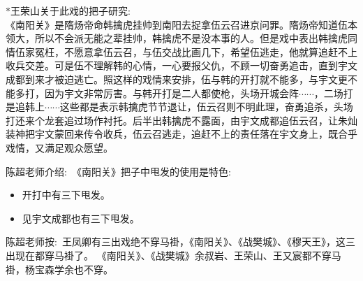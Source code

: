 {{{




\vspace{5pt}






}}

}
\vspace{20pt}
$\ast$王荣山关于此戏的把子研究:\\《南阳关》是隋炀帝命韩擒虎挂帅到南阳去捉拿伍云召进京问罪。隋炀帝知道伍本领大，所以不会派无能之辈挂帅，韩擒虎不是没本事的人。但是戏中表出韩擒虎同情伍家冤枉，不愿意拿伍云召，与伍交战比画几下，希望伍逃走，他就算追赶不上收兵交差。可是伍不理解韩的心情，一心要报父仇，不顾一切奋勇追击，直到宇文成都到来才被迫逃亡。照这样的戏情来安排，伍与韩的开打就不能多，与宇文更不能多打，因为宇文非常厉害。与韩开打是二人都使枪，头场开城会阵$\cdots{}\cdots{}$，二场打是追韩上$\cdots{}\cdots{}$这些都是表示韩擒虎节节退让，伍云召则不明此理，奋勇追杀，头场打还来个龙套追过场作衬托。后半出韩擒虎不露面，由宇文成都追伍云召，让朱灿装神把宇文蒙回来传令收兵，伍云召逃走，追赶不上的责任落在宇文身上，既合乎戏情，又满足观众愿望。

\vspace{15pt}
陈超老师介绍:~《南阳关》把子中甩发的使用是特色:
\begin{itemize}
	\item 开打中有三下甩发。
		\item 见宇文成都也有三下甩发。
\end{itemize}

陈超老师按:~{\hei 王凤卿有三出戏绝不穿马褂，《南阳关》、《战樊城》、《穆天王》，这三出现在都穿马褂了。} 《南阳关》、《战樊城》余叔岩、王荣山、王又宸都不穿马褂，杨宝森学余也不穿。

